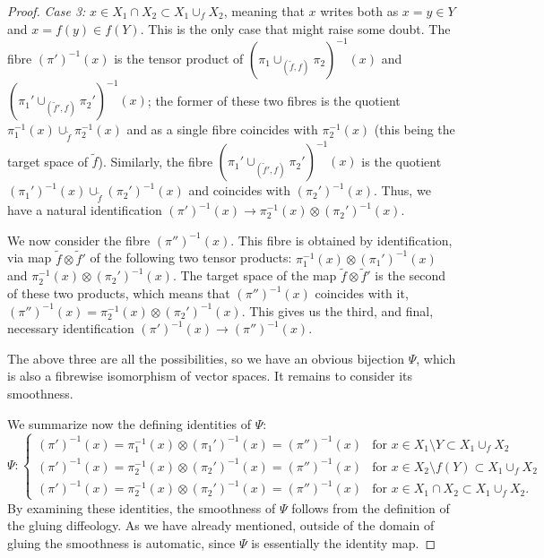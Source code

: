 \documentclass{article}
\begin{document}
\begin{proof}
\noindent\emph{Case 3:} $x\in X_1\cap X_2\subset X_1\cup_f X_2$, meaning that $x$ writes both as $x=y\in Y$ and $x=f(y)\in f(Y)$. This is the only case that might raise some doubt. The fibre $(\pi')^{-1}(x)$ 
is the tensor product of $(\pi_1\cup_{(\tilde{f},f)}\pi_2)^{-1}(x)$ and $(\pi_1'\cup_{(\tilde{f}',f)}\pi_2')^{-1}(x)$; the former of these two fibres is the quotient $\pi_1^{-1}(x)\cup_{\tilde{f}}\pi_2^{-1}(x)$ and as a single 
fibre coincides with $\pi_2^{-1}(x)$ (this being the target space of $\tilde{f}$). Similarly, the fibre $(\pi_1'\cup_{(\tilde{f}',f)}\pi_2')^{-1}(x)$ is the quotient $(\pi_1')^{-1}(x)\cup_{\tilde{f}}(\pi_2')^{-1}(x)$ and coincides
with $(\pi_2')^{-1}(x)$. Thus, we have a natural identification $(\pi')^{-1}(x)\to\pi_2^{-1}(x)\otimes(\pi_2')^{-1}(x)$.

We now consider the fibre $(\pi'')^{-1}(x)$. This fibre is obtained by identification, via map $\tilde{f}\otimes\tilde{f}'$ of the following two tensor products: $\pi_1^{-1}(x)\otimes(\pi_1')^{-1}(x)$ and 
$\pi_2^{-1}(x)\otimes(\pi_2')^{-1}(x)$. The target space of the map $\tilde{f}\otimes\tilde{f}'$ is the second of these two products, which means that $(\pi'')^{-1}(x)$ coincides with it,
$(\pi'')^{-1}(x)=\pi_2^{-1}(x)\otimes(\pi_2')^{-1}(x)$. This gives us the third, and final, necessary identification $(\pi')^{-1}(x)\to(\pi'')^{-1}(x)$.

The above three are all the possibilities, so we have an obvious bijection $\Psi$, which is also a fibrewise isomorphism of vector spaces. It remains to consider its smoothness.

We summarize now the defining identities of $\Psi$:
$$\Psi:\left\{\begin{array}{ll}
(\pi')^{-1}(x)=\pi_1^{-1}(x)\otimes(\pi_1')^{-1}(x)=(\pi'')^{-1}(x)& \mbox{for }x\in X_1\setminus Y\subset X_1\cup_f X_2 \\
(\pi')^{-1}(x)=\pi_2^{-1}(x)\otimes(\pi_2')^{-1}(x)=(\pi'')^{-1}(x) & \mbox{for }x\in X_2\setminus f(Y)\subset X_1\cup_f X_2 \\
(\pi')^{-1}(x)=\pi_2^{-1}(x)\otimes(\pi_2')^{-1}(x)=(\pi'')^{-1}(x) & \mbox{for }x\in X_1\cap X_2\subset X_1\cup_f X_2.
\end{array}\right.$$
By examining these identities, the smoothness of $\Psi$ follows from the definition of the gluing diffeology. As we have already mentioned, outside of the domain of gluing the smoothness is automatic, since 
$\Psi$ is essentially the identity map.


\end{proof}
\end{document}
